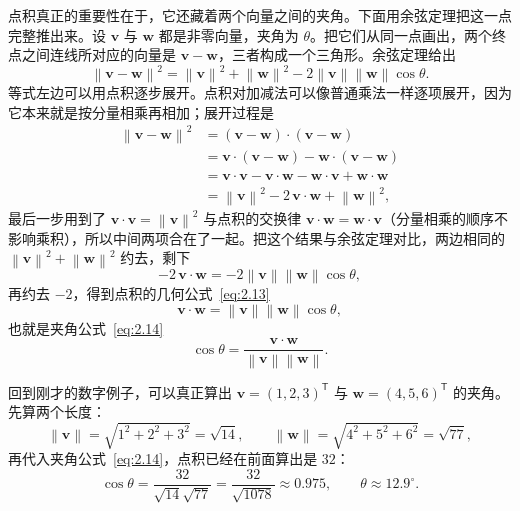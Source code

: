\documentclass[UTF8,a4paper,12pt]{ctexart}
\numberwithin{equation}{section}
\newcommand{\norm}[1]{\left\lVert #1 \right\rVert}
\newcommand{\trans}{^{\mathsf T}}
\begin{document}
	点积真正的重要性在于，它还藏着两个向量之间的夹角。下面用余弦定理把这一点完整推出来。设 $\bm{v}$ 与 $\bm{w}$ 都是非零向量，夹角为 $\theta$。把它们从同一点画出，两个终点之间连线所对应的向量是 $\bm{v}-\bm{w}$，三者构成一个三角形。余弦定理给出
	\begin{equation}\label{eq:2.10}
	\norm{\bm{v}-\bm{w}}^2=\norm{\bm{v}}^2+\norm{\bm{w}}^2-2\norm{\bm{v}}\norm{\bm{w}}\cos\theta.
	\end{equation}
	等式左边可以用点积逐步展开。点积对加减法可以像普通乘法一样逐项展开，因为它本来就是按分量相乘再相加；展开过程是
	\begin{equation}\label{eq:2.11}
	\begin{aligned}
	\norm{\bm{v}-\bm{w}}^2
	&=(\bm{v}-\bm{w})\cdot(\bm{v}-\bm{w})\\
	&=\bm{v}\cdot(\bm{v}-\bm{w})-\bm{w}\cdot(\bm{v}-\bm{w})\\
	&=\bm{v}\cdot\bm{v}-\bm{v}\cdot\bm{w}-\bm{w}\cdot\bm{v}+\bm{w}\cdot\bm{w}\\
	&=\norm{\bm{v}}^2-2\,\bm{v}\cdot\bm{w}+\norm{\bm{w}}^2,
	\end{aligned}
	\end{equation}
	最后一步用到了 $\bm{v}\cdot\bm{v}=\norm{\bm{v}}^2$ 与点积的交换律 $\bm{v}\cdot\bm{w}=\bm{w}\cdot\bm{v}$（分量相乘的顺序不影响乘积），所以中间两项合在了一起。把这个结果与余弦定理对比，两边相同的 $\norm{\bm{v}}^2+\norm{\bm{w}}^2$ 约去，剩下
	\begin{equation}\label{eq:2.12}
	-2\,\bm{v}\cdot\bm{w}=-2\norm{\bm{v}}\norm{\bm{w}}\cos\theta,
	\end{equation}
再约去 $-2$，得到点积的几何公式~\eqref{eq:2.13}
	\begin{equation}\label{eq:2.13}
	\bm{v}\cdot\bm{w}=\norm{\bm{v}}\norm{\bm{w}}\cos\theta,
	\end{equation}
也就是夹角公式~\eqref{eq:2.14}
	\begin{equation}\label{eq:2.14}
	\cos\theta=\frac{\bm{v}\cdot\bm{w}}{\norm{\bm{v}}\norm{\bm{w}}}.
	\end{equation}

	回到刚才的数字例子，可以真正算出 $\bm{v}=(1,2,3)\trans$ 与 $\bm{w}=(4,5,6)\trans$ 的夹角。先算两个长度：
	\begin{equation}\label{eq:2.15}
	\norm{\bm{v}}=\sqrt{1^2+2^2+3^2}=\sqrt{14},
	\qquad
	\norm{\bm{w}}=\sqrt{4^2+5^2+6^2}=\sqrt{77},
	\end{equation}
再代入夹角公式~\eqref{eq:2.14}，点积已经在前面算出是 $32$：
	\begin{equation}\label{eq:2.16}
	\cos\theta=\frac{32}{\sqrt{14}\sqrt{77}}=\frac{32}{\sqrt{1078}}\approx 0.975,
	\qquad
	\theta\approx 12.9^\circ.
	\end{equation}
\end{document}
